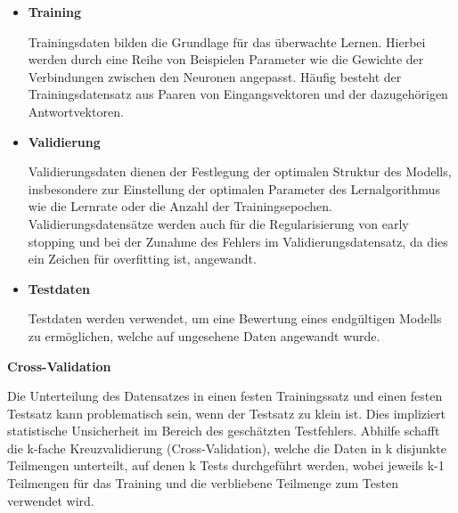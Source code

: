 \begin{itemize} 
\item \textbf{Training} \vspace{5pt}

Trainingsdaten bilden die Grundlage für das überwachte Lernen. Hierbei werden durch eine Reihe von Beispielen Parameter wie die Gewichte der Verbindungen zwischen den Neuronen angepasst. Häufig besteht der Trainingsdatensatz aus Paaren von Eingangsvektoren und der dazugehörigen Antwortvektoren. \vspace{10pt}

\item \textbf{Validierung} \vspace{5pt}

Validierungsdaten dienen der Festlegung der optimalen Struktur des Modells, insbesondere zur Einstellung der optimalen Parameter des Lernalgorithmus wie die Lernrate oder die Anzahl der Trainingsepochen. Validierungsdatensätze werden auch für die Regularisierung von  \dq early stopping\grqq{} und bei der Zunahme des Fehlers im Validierungsdatensatz, da dies ein Zeichen für  \dq overfitting\grqq{} ist, angewandt. \vspace{10pt}

\item \textbf{Testdaten} \vspace{5pt}

Testdaten werden verwendet, um eine Bewertung eines endgültigen Modells zu ermöglichen, welche auf ungesehene Daten angewandt wurde.

\end{itemize}\vspace{10pt}


\textbf{Cross-Validation} \vspace{10pt}

Die Unterteilung des Datensatzes in einen festen Trainingssatz und einen festen Testsatz kann problematisch sein, wenn der Testsatz zu klein ist. Dies impliziert statistische Unsicherheit im Bereich des geschätzten Testfehlers. Abhilfe schafft die k-fache Kreuzvalidierung (Cross-Validation), welche die Daten in k disjunkte Teilmengen unterteilt, auf denen k Tests durchgeführt werden, wobei jeweils k-1 Teilmengen für das Training und die verbliebene Teilmenge zum Testen verwendet wird. \cite{hoffmann2014proceedings}



